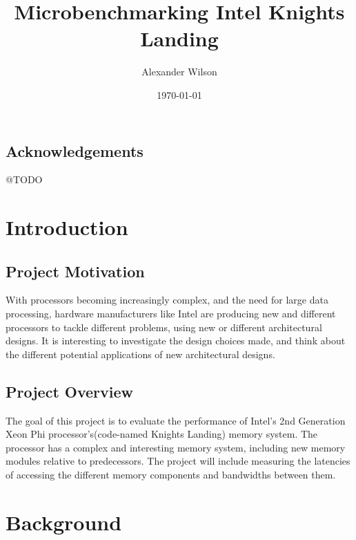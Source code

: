 \documentclass[bsc,frontabs,twoside,singlespacing,parskip,deptreport]{infthesis}     %
\begin{document}
\title{Microbenchmarking Intel Knights Landing}

\author{Alexander Wilson}
 


\date{\today} 


\maketitle



\section*{Acknowledgements}
@TODO 

\tableofcontents


\chapter{Introduction}
\section{Project Motivation}
With processors becoming increasingly complex, and the need for large data processing, hardware manufacturers like Intel are producing new and different processors to tackle different problems, using new or different architectural designs. It is interesting to investigate the design choices made, and think about the different potential applications of new architectural designs.

\section{Project Overview}
The goal of this project is to evaluate the performance of Intel's 2nd Generation Xeon Phi processor's(code-named Knights Landing) memory system. The processor has a complex and interesting memory system, including new memory modules relative to predecessors. The project will include measuring the latencies of accessing the different memory components and bandwidths between them.

\chapter{Background}
\end{document}
